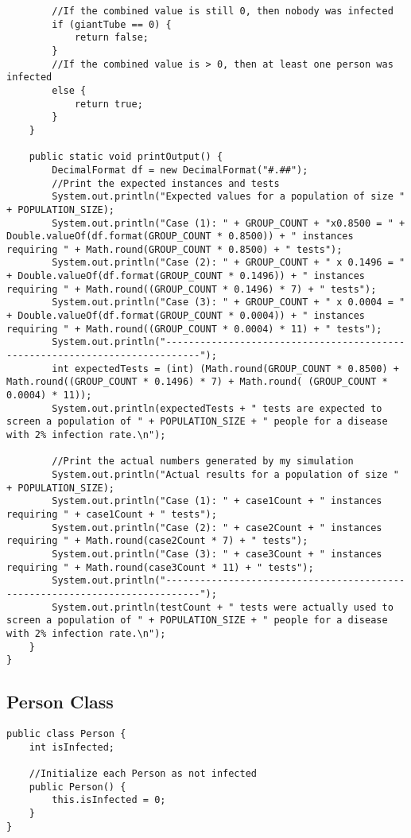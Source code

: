 \documentclass[letterpaper, 10pt,DIV=13]{scrartcl}
\numberwithin{equation}{section} %
\numberwithin{figure}{section} %
\numberwithin{table}{section} %
\begin{document}
\begin{lstlisting}
        //If the combined value is still 0, then nobody was infected
        if (giantTube == 0) {
            return false;
        } 
        //If the combined value is > 0, then at least one person was infected
        else {
            return true;
        }
    }

    public static void printOutput() {
        DecimalFormat df = new DecimalFormat("#.##");  
        //Print the expected instances and tests
        System.out.println("Expected values for a population of size " + POPULATION_SIZE);
        System.out.println("Case (1): " + GROUP_COUNT + "x0.8500 = " + Double.valueOf(df.format(GROUP_COUNT * 0.8500)) + " instances requiring " + Math.round(GROUP_COUNT * 0.8500) + " tests");
        System.out.println("Case (2): " + GROUP_COUNT + " x 0.1496 = " + Double.valueOf(df.format(GROUP_COUNT * 0.1496)) + " instances requiring " + Math.round((GROUP_COUNT * 0.1496) * 7) + " tests");
        System.out.println("Case (3): " + GROUP_COUNT + " x 0.0004 = " + Double.valueOf(df.format(GROUP_COUNT * 0.0004)) + " instances requiring " + Math.round((GROUP_COUNT * 0.0004) * 11) + " tests");
        System.out.println("----------------------------------------------------------------------------");
        int expectedTests = (int) (Math.round(GROUP_COUNT * 0.8500) + Math.round((GROUP_COUNT * 0.1496) * 7) + Math.round( (GROUP_COUNT * 0.0004) * 11));
        System.out.println(expectedTests + " tests are expected to screen a population of " + POPULATION_SIZE + " people for a disease with 2% infection rate.\n");

        //Print the actual numbers generated by my simulation
        System.out.println("Actual results for a population of size " + POPULATION_SIZE);
        System.out.println("Case (1): " + case1Count + " instances requiring " + case1Count + " tests");
        System.out.println("Case (2): " + case2Count + " instances requiring " + Math.round(case2Count * 7) + " tests");
        System.out.println("Case (3): " + case3Count + " instances requiring " + Math.round(case3Count * 11) + " tests");
        System.out.println("----------------------------------------------------------------------------");
        System.out.println(testCount + " tests were actually used to screen a population of " + POPULATION_SIZE + " people for a disease with 2% infection rate.\n");
    }
}
\end{lstlisting}

\subsection{Person Class}
\begin{lstlisting}
public class Person {
    int isInfected;
    
    //Initialize each Person as not infected
    public Person() {
        this.isInfected = 0;
    }
}
\end{lstlisting}
\end{document}
